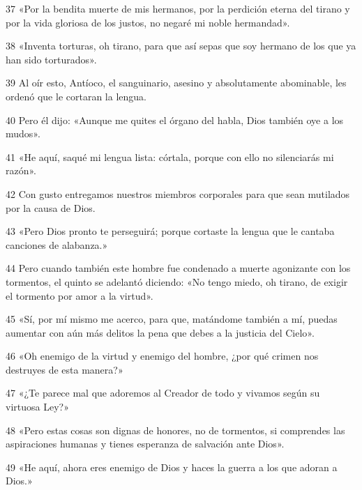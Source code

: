 \par 37 «Por la bendita muerte de mis hermanos, por la perdición eterna del tirano y por la vida gloriosa de los justos, no negaré mi noble hermandad».

\par 38 «Inventa torturas, oh tirano, para que así sepas que soy hermano de los que ya han sido torturados».

\par 39 Al oír esto, Antíoco, el sanguinario, asesino y absolutamente abominable, les ordenó que le cortaran la lengua.

\par 40 Pero él dijo: «Aunque me quites el órgano del habla, Dios también oye a los mudos».

\par 41 «He aquí, saqué mi lengua lista: córtala, porque con ello no silenciarás mi razón».

\par 42 Con gusto entregamos nuestros miembros corporales para que sean mutilados por la causa de Dios.

\par 43 «Pero Dios pronto te perseguirá; porque cortaste la lengua que le cantaba canciones de alabanza.»

\par 44 Pero cuando también este hombre fue condenado a muerte agonizante con los tormentos, el quinto se adelantó diciendo: «No tengo miedo, oh tirano, de exigir el tormento por amor a la virtud».

\par 45 «Sí, por mí mismo me acerco, para que, matándome también a mí, puedas aumentar con aún más delitos la pena que debes a la justicia del Cielo».

\par 46 «Oh enemigo de la virtud y enemigo del hombre, ¿por qué crimen nos destruyes de esta manera?»

\par 47 «¿Te parece mal que adoremos al Creador de todo y vivamos según su virtuosa Ley?»

\par 48 «Pero estas cosas son dignas de honores, no de tormentos, si comprendes las aspiraciones humanas y tienes esperanza de salvación ante Dios».

\par 49 «He aquí, ahora eres enemigo de Dios y haces la guerra a los que adoran a Dios.»


